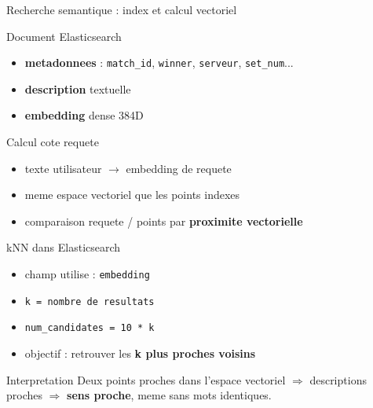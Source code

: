 \documentclass[aspectratio=169, 11pt]{beamer}
\begin{document}
\begin{frame}{Recherche semantique : index et calcul vectoriel}
    {\small
    \begin{block}{Document Elasticsearch}
        \begin{itemize}
            \item \textbf{metadonnees} : \texttt{match\_id}, \texttt{winner}, \texttt{serveur}, \texttt{set\_num}...
            \item \textbf{description} textuelle
            \item \textbf{embedding} dense 384D
        \end{itemize}
    \end{block}

    \begin{block}{Calcul cote requete}
        \begin{itemize}
            \item texte utilisateur $\rightarrow$ embedding de requete
            \item meme espace vectoriel que les points indexes
            \item comparaison requete / points par \textbf{proximite vectorielle}
        \end{itemize}
    \end{block}
    
    \begin{block}{kNN dans Elasticsearch}
        \begin{itemize}
            \item champ utilise : \texttt{embedding}
            \item \texttt{k = nombre de resultats}
            \item \texttt{num\_candidates = 10 * k}
            \item objectif : retrouver les \textbf{k plus proches voisins}
        \end{itemize}
    \end{block}

    \begin{alertblock}{Interpretation}
        Deux points proches dans l'espace vectoriel
        $\Rightarrow$ descriptions proches
        $\Rightarrow$ \textbf{sens proche}, meme sans mots identiques.
    \end{alertblock}
    }
\end{frame}
\end{document}
